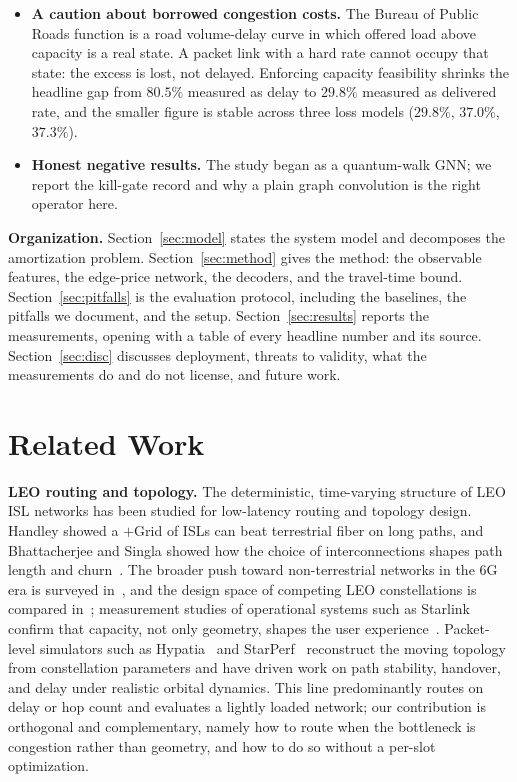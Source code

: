 \documentclass[journal]{IEEEtran}
\begin{document}
\begin{itemize}
\item \textbf{A caution about borrowed congestion costs.} The Bureau of Public Roads function is
a road volume-delay curve in which offered load above capacity is a real state. A packet link
with a hard rate cannot occupy that state: the excess is lost, not delayed. Enforcing capacity
feasibility shrinks the headline gap from $80.5\%$ measured as delay to $29.8\%$ measured as delivered rate, and the smaller figure is stable across three loss models ($29.8\%$, $37.0\%$, $37.3\%$).

\item \textbf{Honest negative results.} The study began as a quantum-walk GNN; we report the
kill-gate record and why a plain graph convolution is the right operator here.
\end{itemize}

\textbf{Organization.} Section~\ref{sec:model} states the system model and
decomposes the amortization problem. Section~\ref{sec:method} gives the method: the observable
features, the edge-price network, the decoders, and the travel-time bound.
Section~\ref{sec:pitfalls} is the evaluation protocol, including the baselines, the pitfalls we
document, and the setup. Section~\ref{sec:results} reports the measurements, opening with a table
of every headline number and its source. Section~\ref{sec:disc} discusses deployment, threats to
validity, what the measurements do and do not license, and future work.

\section{Related Work}
\textbf{LEO routing and topology.} The deterministic, time-varying structure of LEO ISL networks has been studied for low-latency routing and topology design. Handley showed a $+$Grid of ISLs can beat terrestrial fiber on long paths, and Bhattacherjee and Singla showed how the choice of interconnections shapes path length and churn~\cite{handley2018,bhattacherjee2019}. The broader push toward non-terrestrial networks in the
$6$G era is surveyed in~\cite{kodheli,giordani}, and the design space of competing LEO
constellations is compared in~\cite{delportillo}; measurement studies of operational
systems such as Starlink confirm that capacity, not only geometry, shapes the user
experience~\cite{michel}. Packet-level simulators such as Hypatia~\cite{hypatia} and
StarPerf~\cite{starperf} reconstruct the moving topology from constellation parameters and
have driven work on path stability, handover, and delay under realistic orbital dynamics.
This line predominantly routes on delay or hop count and evaluates a lightly loaded
network; our contribution is orthogonal and complementary, namely how to route when the
bottleneck is congestion rather than geometry, and how to do so without a per-slot
optimization.
\end{document}
